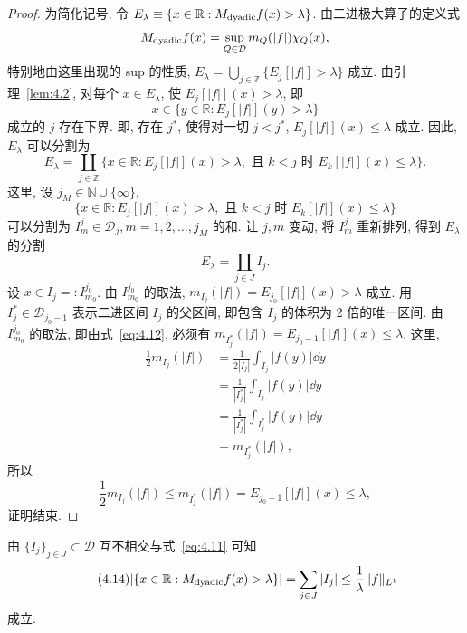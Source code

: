 \begin{proof}
为简化记号, 令 $E_{\lambda} \equiv \{x \in \mathbb{R} : M_{\mathrm{dyadic}}f(x) > \lambda\}$. 由二进极大算子的定义式
\[
M_{\mathrm{dyadic}}f(x) = \sup_{Q \in \mathcal{D}}m_{Q}(|f|)\chi_{Q}(x),
\]
特别地由这里出现的 sup 的性质, $E_{\lambda} = \bigcup_{j \in \mathbb{Z}}\{E_{j}[|f|] > \lambda\}$ 成立. 由引理~\ref{lem:4.2}, 对每个 $x \in E_{\lambda}$, 使 $E_{j}[|f|](x) > \lambda$, 即
\[
x \in \{y \in \mathbb{R} : E_{j}[|f|](y) > \lambda\}
\]
成立的 $j$ 存在下界. 即, 存在 $j^{*}$, 使得对一切 $j < j^{*}$, $E_{j}[|f|](x) \leq \lambda$ 成立. 因此, $E_{\lambda}$ 可以分割为
\[
E_{\lambda} = \coprod_{j \in \mathbb{Z}}\{x \in \mathbb{R} : E_{j}[|f|](x) > \lambda, \text{ 且 } k < j \text{ 时 } E_{k}[|f|](x) \leq \lambda\}.
\]
这里, 设 $j_{M} \in \mathbb{N} \cup \{\infty\}$,
\begin{equation}\tag{4.12}
\{x \in \mathbb{R} : E_{j}[|f|](x) > \lambda, \text{ 且 } k < j \text{ 时 } E_{k}[|f|](x) \leq \lambda\}
\label{eq:4.12}
\end{equation}
可以分割为 $I_{m}^{j} \in \mathcal{D}_{j}, m = 1, 2, \ldots, j_{M}$ 的和. 让 $j, m$ 变动, 将 $I_{m}^{j}$ 重新排列, 得到 $E_{\lambda}$ 的分割
\begin{equation}\tag{4.13}
E_{\lambda} = \coprod_{j \in J}I_{j}.
\label{eq:4.13}
\end{equation}
设 $x \in I_{j} =: I_{m_{0}}^{j_{0}}$. 由 $I_{m_{0}}^{j_{0}}$ 的取法, $m_{I_{j}}(|f|) = E_{j_{0}}[|f|](x) > \lambda$ 成立. 用 $I_{j}^{*} \in \mathcal{D}_{j_{0}-1}$ 表示二进区间 $I_{j}$ 的父区间, 即包含 $I_{j}$ 的体积为 2 倍的唯一区间. 由 $I_{m_{0}}^{j_{0}}$ 的取法, 即由式~\eqref{eq:4.12}, 必须有 $m_{I_{j}^{*}}(|f|) = E_{j_{0}-1}[|f|](x) \leq \lambda$. 这里,
\begin{align*}
\frac{1}{2}m_{I_{j}}(|f|) &= \frac{1}{2|I_{j}|}\int_{I_{j}}|f(y)|\dd y \\
&= \frac{1}{|I_{j}^{*}|}\int_{I_{j}}|f(y)|\dd y \\
&= \frac{1}{|I_{j}^{*}|}\int_{I_{j}^{*}}|f(y)|\dd y \\
&= m_{I_{j}^{*}}(|f|),
\end{align*}
所以
\[
\frac{1}{2}m_{I_{j}}(|f|) \leq m_{I_{j}^{*}}(|f|) = E_{j_{0}-1}[|f|](x) \leq \lambda,
\]
证明结束.
\end{proof}

由 $\{I_{j}\}_{j \in J} \subset \mathcal{D}$ 互不相交与式~\eqref{eq:4.11} 可知
\begin{equation}\tag{4.14}
|\{x \in \mathbb{R} : M_{\mathrm{dyadic}}f(x) > \lambda\}| = \sum_{j \in J}|I_{j}| \leq \frac{1}{\lambda}\|f\|_{L^{1}}
\label{eq:4.14}
\end{equation}
成立.

